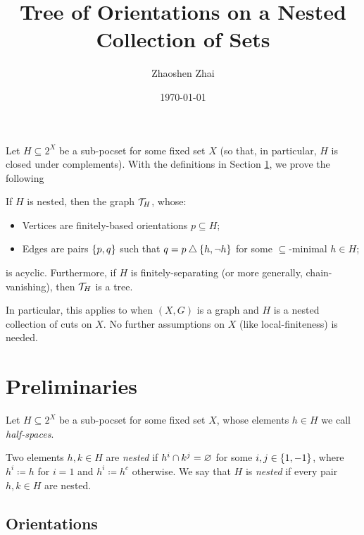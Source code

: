 \documentclass{amsart}
\begin{document}
    \title{Tree of Orientations on a Nested Collection of Sets}
    \author{Zhaoshen Zhai}
    \date{\today}
    \maketitle

    Let $H\subseteq2^X$ be a sub-pocset for some fixed set $X$ (so that, in particular, $H$ is closed under complements). With the definitions in Section \ref{prelim}, we prove the following
    \begin{mainTheorem}\label{main}
        If $H$ is nested, then the graph $\mc{T}_H$, whose:
        \begin{itemize}
            \item Vertices are finitely-based orientations $p\subseteq H$;
            \item Edges are pairs $\l\{p,q\r\}$ such that $q=p\symdiff\l\{h,\lnot h\r\}$ for some $\subseteq$-minimal $h\in H$;
        \end{itemize}
        is acyclic. Furthermore, if $H$ is finitely-separating (or more generally, chain-vanishing), then $\mc{T}_H$ is a tree.
    \end{mainTheorem}

    In particular, this applies to when $(X,G)$ is a graph and $H$ is a nested collection of cuts on $X$. No further assumptions on $X$ (like local-finiteness) is needed.

    \section{Preliminaries}\label{prelim}

    Let $H\subseteq2^X$ be a sub-pocset for some fixed set $X$, whose elements $h\in H$ we call \textit{half-spaces}.

    \begin{definition}
        Two elements $h,k\in H$ are \textit{nested} if $h^i\cap k^j=\em$ for some $i,j\in\l\{1,-1\r\}$, where $h^i\coloneqq h$ for $i=1$ and $h^i\coloneqq h^c$ otherwise. We say that $H$ is \textit{nested} if every pair $h,k\in H$ are nested.
    \end{definition}

    \subsection{Orientations}
\end{document}
